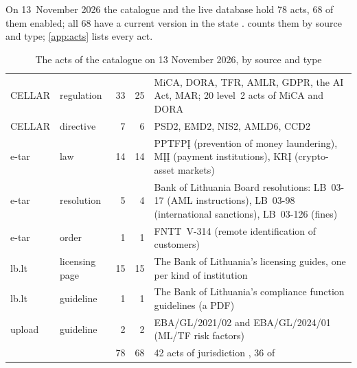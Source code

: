 On 13~November 2026 the catalogue and the live database hold 78 acts, 68 of them enabled; all
68 have a current version in the state .  counts them by
source and type; \cref{app:acts} lists every act.

\begin{table}[H]
\caption{The acts of the catalogue on 13 November 2026, by source and type}\label{tab:corpus:counts}
\begin{tabularx}{\textwidth}{@{}L{24mm}L{31mm}rrY@{}}
\toprule
{} &  &  &  &  \\
\midrule
CELLAR & regulation & 33 & 25 & MiCA, DORA, TFR, AMLR, GDPR, the AI Act, MAR; 20 level~2 acts of MiCA and DORA \\
CELLAR & directive & 7 & 6 & PSD2, EMD2, NIS2, AMLD6, CCD2 \\
e-tar & law & 14 & 14 & PPTFPĮ (prevention of money laundering), MĮĮ (payment institutions), KRĮ (crypto-asset markets) \\
e-tar & resolution & 5 & 4 & Bank of Lithuania Board resolutions: LB~03-17 (AML instructions), LB~03-98 (international sanctions), LB~03-126 (fines) \\
e-tar & order & 1 & 1 & FNTT~V-314 (remote identification of customers) \\
lb.lt & licensing page & 15 & 15 & The Bank of Lithuania's licensing guides, one per kind of institution \\
lb.lt & guideline & 1 & 1 & The Bank of Lithuania's compliance function guidelines (a PDF) \\
upload & guideline & 2 & 2 & EBA/GL/2021/02 and EBA/GL/2024/01 (ML/TF risk factors) \\
\midrule
 & & 78 & 68 & 42 acts of jurisdiction , 36 of  \\
\bottomrule
\end{tabularx}
\end{table}

